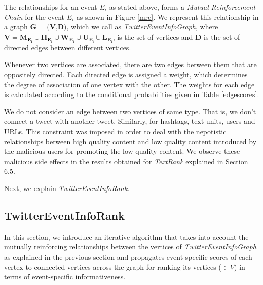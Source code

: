 
The relationships for an event $\scriptstyle E_{i}$ as stated above, forms a \textit{Mutual Reinforcement Chain} \cite{wei2008query} for the event $E_{i}$ as shown in Figure \ref{mrc}. We represent this relationship in a graph $\textbf{G = (V,D)}$, which we call as \textit{TwitterEventInfoGraph}, where $\mathbf{V = M_{E_{i}} \cup H_{E_{i}} \cup W_{E_{i}} \cup U_{E_{i}} \cup L_{E_{i}}}$, is the set of vertices and $\mathbf{D}$ is the set of directed edges between different vertices. 

Whenever two vertices are associated, there are two edges between them that are oppositely directed. Each directed edge is assigned a weight, which determines the degree of association of one vertex with the other. The weights for each edge is calculated according to the conditional probabilities given in Table \ref{edgescores}. 

We do not consider an edge between two vertices of same type. That is, we don't connect a tweet with another tweet. Similarly, for hashtags, text units, users and URLs. This constraint was imposed in order to deal with the nepotistic relationships between high quality content and low quality content introduced by the malicious users for promoting the low quality content. We observe these malicious side effects in the results obtained for \textit{TextRank} explained in Section 6.5.  

Next, we explain \textit{TwitterEventInfoRank}.


\subsection{TwitterEventInfoRank\label{twitterEventInfoRank}}
In this section, we introduce an iterative algorithm that takes into account the mutually reinforcing relationships between the vertices of \textit{TwitterEventInfoGraph} as explained in the previous section and propagates event-specific scores of each vertex to connected vertices across the graph for ranking its vertices ($\scriptstyle \in V$) in terms of event-specific informativeness.


